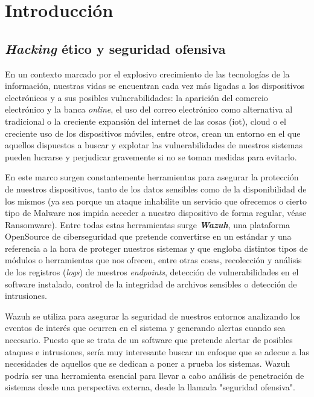 \chapter{Introducción}

\section{\textit{Hacking} ético y seguridad ofensiva}

En un contexto marcado por el explosivo crecimiento de las tecnologías de la información, nuestras vidas se encuentran cada vez más ligadas a los dispositivos electrónicos y a sus posibles vulnerabilidades: la aparición del comercio electrónico y la banca \textit{online}, el uso del correo electrónico como alternativa al tradicional o la creciente expansión del internet de las cosas (\acrshort{iot}), \gls{cloud} o el creciente uso de los dispositivos móviles, entre otros, crean un entorno en el que aquellos dispuestos a buscar y explotar las vulnerabilidades de nuestros sistemas pueden lucrarse y perjudicar gravemente si no se toman medidas para evitarlo.

En este marco surgen constantemente herramientas para asegurar la protección de nuestros dispositivos, tanto de los datos sensibles como de la disponibilidad de los mismos (ya sea porque un ataque inhabilite un servicio que ofrecemos o cierto tipo de \Gls{Malware} nos impida acceder a nuestro dispositivo de forma regular, véase \gls{Ransomware}). Entre todas estas herramientas surge \textbf{\textit{Wazuh}}, una plataforma \gls{OpenSource} de ciberseguridad que pretende convertirse en un estándar y una referencia a la hora de proteger nuestros sistemas y que engloba distintos tipos de módulos o herramientas que nos ofrecen, entre otras cosas, recolección y análisis de los registros (\textit{logs}) de nuestros \textit{endpoints}, detección de vulnerabilidades en el software instalado, control de la integridad de archivos sensibles o detección de intrusiones. 

Wazuh se utiliza para asegurar la seguridad de nuestros entornos analizando los eventos de interés que ocurren en el sistema y generando alertas cuando sea necesario. Puesto que se trata de un software que pretende alertar de posibles ataques e intrusiones, sería muy interesante buscar un enfoque que se adecue a las necesidades de aquellos que se dedican a poner a prueba los sistemas. Wazuh podría ser una herramienta esencial para llevar a cabo análisis de penetración de sistemas desde una perspectiva externa, desde la llamada "seguridad ofensiva". 

